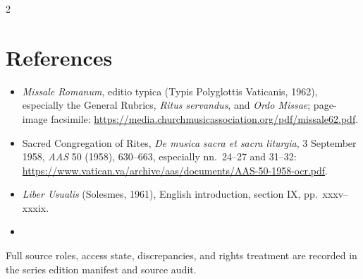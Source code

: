 \begin{multicols}{2}
\section{References}

\begin{itemize}[leftmargin=1.05em,labelsep=0.35em,topsep=0.1em,
  itemsep=0.12em,parsep=0pt,partopsep=0pt]
  \item \textit{Missale Romanum}, editio typica (Typis Polyglottis Vaticanis,
  1962), especially the General Rubrics, \textit{Ritus servandus}, and
  \textit{Ordo Missae}; page-image facsimile:
  \url{https://media.churchmusicassociation.org/pdf/missale62.pdf}.
  \item Sacred Congregation of Rites, \textit{De musica sacra et sacra
  liturgia}, 3 September 1958, \textit{AAS} 50 (1958), 630--663, especially
  nn.\ 24--27 and 31--32:
  \url{https://www.vatican.va/archive/aas/documents/AAS-50-1958-ocr.pdf}.
  \item \textit{Liber Usualis} (Solesmes, 1961), English introduction,
  section IX, pp.\ xxxv--xxxix.
  \item \GuideCeremonialReferences
\end{itemize}

Full source roles, access state, discrepancies, and rights treatment are
recorded in the series edition manifest and source audit.

\end{multicols}
\endgroup

\RaggedRight
